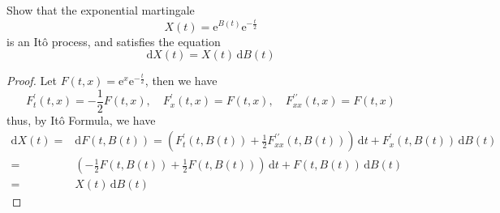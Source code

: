 \begin{example}
    Show that the exponential martingale
    \begin{equation*}
        X(t)=\mathrm{e}^{B(t)}\mathrm{e}^{-\frac{t}{2}}
    \end{equation*}
    is an It\^o process, and satisfies the equation
    \begin{equation*}
        \mathrm{d}X(t)=X(t)\,\mathrm{d}B(t)
    \end{equation*}
\end{example}
\begin{proof}
    Let $F(t,x)=\mathrm{e}^{x}\mathrm{e}^{-\frac{t}{2}}$, then we have
    \begin{equation*}
        F_{t}^{\prime}(t,x)=-\frac{1}{2}F(t,x),\quad F_{x}^{\prime}(t,x)=F(t,x),\quad F_{xx}^{\prime\prime}(t,x)=F(t,x)
    \end{equation*}
    thus, by It\^o Formula, we have
    \begin{equation*}
        \begin{aligned}
            \mathrm{d}X(t)= & \mathrm{d}F(t,B(t))=\left(F_{t}^{\prime}(t,B(t))+\frac{1}{2}F_{xx}^{\prime\prime}(t,B(t))\right)\,\mathrm{d}t+F_{x}^{\prime}(t,B(t))\,\mathrm{d}B(t) \\
            =               & \left(-\frac{1}{2}F(t,B(t))+\frac{1}{2}F(t,B(t))\right)\,\mathrm{d}t+F(t,B(t))\,\mathrm{d}B(t)                                                       \\
            =               & X(t)\,\mathrm{d}B(t)
        \end{aligned}
    \end{equation*}
\end{proof}

\begin{example}

\end{example}

\begin{example}

\end{example}
